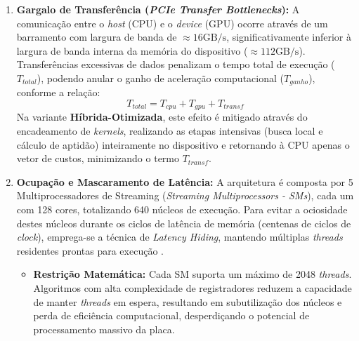 \begin{enumerate}
        Uma análise anterior deste projeto estimou um teto de \(n_{coords} \approx 13.000\) cidades, supondo que a busca \(2\)-opt guardaria todos os \(n(n-1)/2\) movimentos candidatos em dois buffers de \(O(n^2)\) — o que faria desses buffers o maior gasto de memória.
        A implementação real não faz isso: os kernels guardam apenas o melhor movimento corrente por \emph{thread} e percorrem os pares de índices em registradores, com estado auxiliar de \(O(n_{coords})\).
        Com isso, quem limita o tamanho da instância é a matriz de distâncias, e não a busca local; adotando a mesma margem de segurança de \(65\%\) daquela análise, o limite sobe para cerca de \(26.000\) cidades.
  \item
        \textbf{Gargalo de Transferência (\emph{PCIe Transfer Bottlenecks}):} A comunicação entre o \emph{host} (CPU) e o \emph{device} (GPU) ocorre através de um barramento com largura de banda de \(\approx 16 \text{GB/s}\), significativamente inferior à largura de banda interna da memória do dispositivo (\(\approx 112 \text{GB/s}\)). Transferências excessivas de dados penalizam o tempo total de execução (\(T_{total}\)), podendo anular o ganho de aceleração computacional (\(T_{ganho}\)), conforme a relação: \[       T_{total} = T_{cpu} + T_{gpu} + T_{transf} \] Na variante \textbf{Híbrida-Otimizada}, este efeito é mitigado através do encadeamento de \emph{kernels}, realizando as etapas intensivas (busca local e cálculo de aptidão) inteiramente no dispositivo e retornando à CPU apenas o vetor de custos, minimizando o termo \(T_{transf}\).
  \item
        \textbf{Ocupação e Mascaramento de Latência:} A arquitetura é composta por 5 Multiprocessadores de Streaming (\emph{Streaming Multiprocessors - SMs}), cada um com 128 cores, totalizando 640 núcleos de execução. Para evitar a ociosidade destes núcleos durante os ciclos de latência de memória (centenas de ciclos de \emph{clock}), emprega-se a técnica de \emph{Latency Hiding}, mantendo múltiplas \emph{threads} residentes prontas para execução \autocite{kirk2010programming}.

        \begin{itemize}
          \tightlist
          \item
                \textbf{Restrição Matemática:} Cada SM suporta um máximo de 2048 \emph{threads}. Algoritmos com alta complexidade de registradores reduzem a capacidade de manter \emph{threads} em espera, resultando em subutilização dos núcleos e perda de eficiência computacional, desperdiçando o potencial de processamento massivo da placa.
        \end{itemize}
\end{enumerate}

